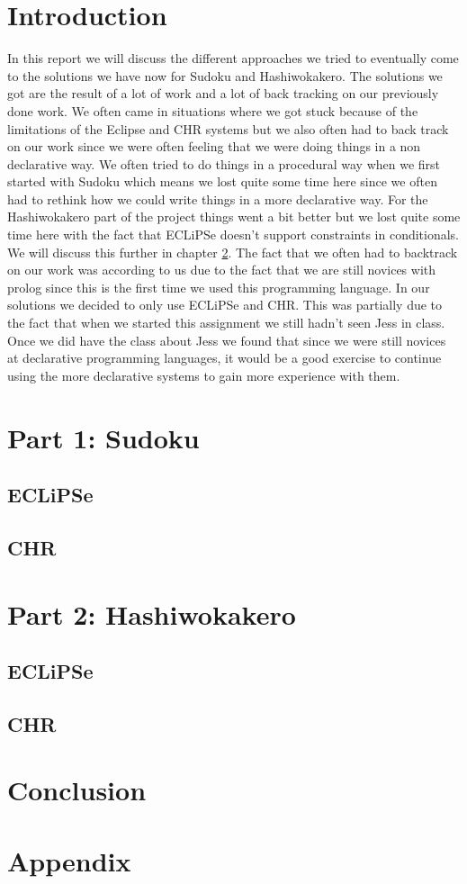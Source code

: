 \documentclass{report}
\begin{document}
\chapter*{Introduction}
In this report we will discuss the different approaches we tried to eventually come to the solutions we have now for Sudoku and Hashiwokakero. The solutions we got are the result of a lot of work and a lot of back tracking on our previously done work. We often came in situations where we got stuck because of the limitations of the Eclipse and CHR systems but we also often had to back track on our work since we were often feeling that we were doing things in a non declarative way. We often tried to do things in a procedural way when we first started with Sudoku which means we lost quite some time here since we often had to rethink how we could write things in a more declarative way. For the Hashiwokakero part of the project things went a bit better but we lost quite some time here with the fact that ECLiPSe doesn't support constraints in conditionals. We will discuss this further in chapter \ref{sec:Hashiwokakero}. The fact that we often had to backtrack on our work was according to us due to the fact that we are still novices with prolog since this is the first time we used this programming language.
	\newline
	\newline
	In our solutions we decided to only use ECLiPSe and CHR. This was partially due to the fact that when we started this assignment we still hadn't seen Jess in class. Once we did have the class about Jess we found that since we were still novices at declarative programming languages, it would be a good exercise to continue using the more declarative systems to gain more experience with them.
	
\chapter{Part 1: Sudoku}
\section{ECLiPSe}
\section{CHR}
\chapter{Part 2: Hashiwokakero}
\label{sec:Hashiwokakero}
\section{ECLiPSe}
\section{CHR}
\chapter{Conclusion}
\chapter{Appendix}
\end{document}
